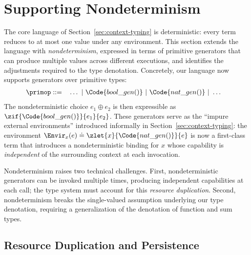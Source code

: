 \section{Supporting Nondeterminism}\label{sec:extension}

The core language of Section~\ref{sec:context-typing} is
deterministic: every term reduces to at most one value under any
environment.  This section extends the language with
\emph{nondeterminism}, expressed in terms of primitive generators that
can produce multiple values across different executions, and
identifies the adjustments required to the type denotation.
Concretely, our language now supports generators over primitive types:
\begin{align*}
  \primop ::= \quad & \ldots ~|~ \Code{bool\_gen()} ~|~
  \Code{nat\_gen()} ~|~ \ldots
\end{align*}
The nondeterministic choice $e_1 \oplus e_2$ is then expressible as
$\zif{\Code{bool\_gen()}}{e_1}{e_2}$.  These generators serve as the
``impure external environments'' introduced informally in
Section~\ref{sec:context-typing}: the environment $\Envir_x(e) \doteq
\zlet{x}{\Code{nat\_gen()}}{e}$ is now a first-class term that
introduces a nondeterministic binding for $x$ whose capability is
\emph{independent} of the surrounding context at each invocation.

Nondeterminism raises two technical challenges.  First, nondeterministic
generators can be invoked multiple times, producing independent
capabilities at each call; the type system must account for this
\emph{resource duplication}.  Second, nondeterminism breaks the
single-valued assumption underlying our type denotation, requiring a
generalization of the denotation of function and sum types.

\subsection{Resource Duplication and Persistence}\label{subsec:duplication}

